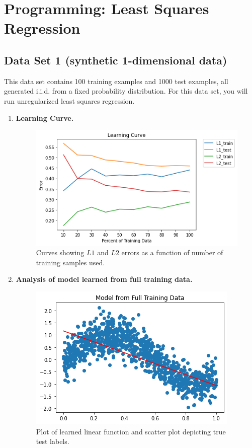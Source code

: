 \section{Programming: Least Squares Regression } 

\subsection {Data Set 1 (synthetic 1-dimensional data)} This data set contains 100 training examples and 1000 test examples, all generated i.i.d. from a fixed probability distribution. For this data set, you will run unregularized least squares regression.

    \begin{enumerate}
    
        \item \textbf{Learning Curve.} 
        \begin{figure}[H]
            \includegraphics[scale=0.5, angle=0]{templates/1_1_1.png}
            \centering
            \caption{Curves showing $L1$ and $L2$ errors as a function of number of training samples used.}
            \label{fig:my_label}
        \end{figure}
        
        \item \textbf{Analysis of model learned from full training data.} 
        
        \begin{figure}[H]
            \centering
            \includegraphics[scale=0.5, angle=0]{templates/1_1_2.png}
            \caption{Plot of learned linear function and scatter plot depicting true test labels.}
            \label{fig:my_label}
        \end{figure}
        

\end{enumerate}
